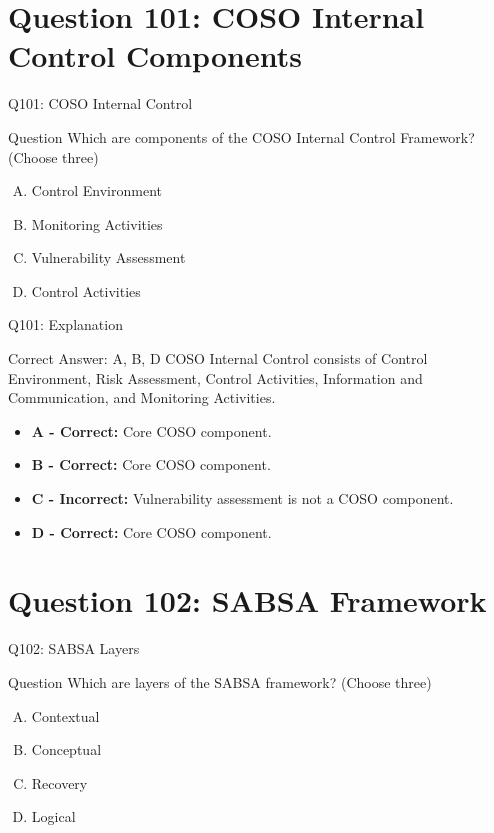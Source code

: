 \documentclass{beamer}
\begin{document}
	\section{Question 101: COSO Internal Control Components}
	
	\begin{frame}{Q101: COSO Internal Control}
		\begin{block}{Question}
			Which are components of the COSO Internal Control Framework?
			(Choose three)
		\end{block}
		
		\begin{enumerate}[(A)]
			\item Control Environment
			\item Monitoring Activities
			\item Vulnerability Assessment
			\item Control Activities
		\end{enumerate}
	\end{frame}
	
	\begin{frame}{Q101: Explanation}
		\begin{block}{Correct Answer: A, B, D}
			COSO Internal Control consists of Control Environment,
			Risk Assessment, Control Activities, Information and
			Communication, and Monitoring Activities.
		\end{block}
		
		\begin{itemize}
			\item \textbf{A - Correct:} Core COSO component.
			\item \textbf{B - Correct:} Core COSO component.
			\item \textbf{C - Incorrect:} Vulnerability assessment is not a COSO component.
			\item \textbf{D - Correct:} Core COSO component.
		\end{itemize}
	\end{frame}
	
	\section{Question 102: SABSA Framework}
	
	\begin{frame}{Q102: SABSA Layers}
		\begin{block}{Question}
			Which are layers of the SABSA framework?
			(Choose three)
		\end{block}
		
		\begin{enumerate}[(A)]
			\item Contextual
			\item Conceptual
			\item Recovery
			\item Logical
		\end{enumerate}
	\end{frame}
	
\end{document}
